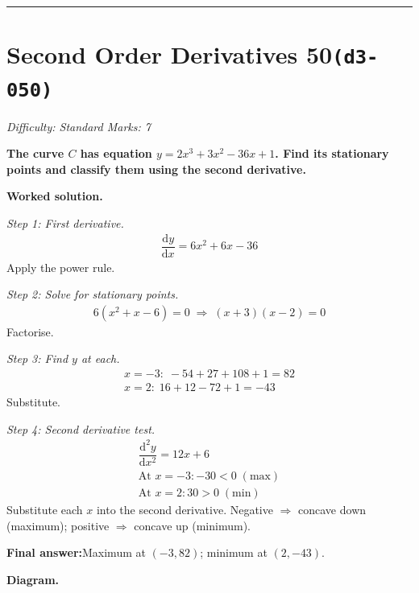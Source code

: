 \documentclass[11pt]{article}
\newcommand{\question}[1]{\par\medskip\noindent\textbf{#1}\par}
\begin{document}
\medskip\hrule

\section*{Second Order Derivatives 50\quad\small\texttt{(d3-050)}}
\textit{Difficulty: Standard \quad\textbar\quad Marks: 7}

\question{The curve \( C \) has equation \( y = 2x^3 + 3x^2 - 36x + 1 \). Find its stationary points and classify them using the second derivative.}

\textbf{Worked solution.}

\textit{Step 1: First derivative.}
\[\begin{gathered}
\dfrac{\mathrm{d}y}{\mathrm{d}x} = 6x^2 + 6x - 36
\end{gathered}\]
Apply the power rule.

\textit{Step 2: Solve for stationary points.}
\[\begin{gathered}
6(x^2 + x - 6) = 0 \;\Rightarrow\; (x+3)(x-2) = 0
\end{gathered}\]
Factorise.

\textit{Step 3: Find \( y \) at each.}
\[\begin{gathered}
x = -3: \; -54 + 27 + 108 + 1 = 82 \\ x = 2: \; 16 + 12 - 72 + 1 = -43
\end{gathered}\]
Substitute.

\textit{Step 4: Second derivative test.}
\[\begin{gathered}
\dfrac{\mathrm{d}^2y}{\mathrm{d}x^2} = 12x + 6 \\ \text{At } x = -3: -30 < 0 \; (\text{max}) \\ \text{At } x = 2: 30 > 0 \; (\text{min})
\end{gathered}\]
Substitute each \(x\) into the second derivative. Negative \(\Rightarrow\) concave down (maximum); positive \(\Rightarrow\) concave up (minimum).

\begin{answerbox}
\textbf{Final answer:}\quad Maximum at \(\displaystyle  (-3, 82) \); minimum at \(\displaystyle  (2, -43) \).
\end{answerbox}
\textbf{Diagram.}
\end{document}
